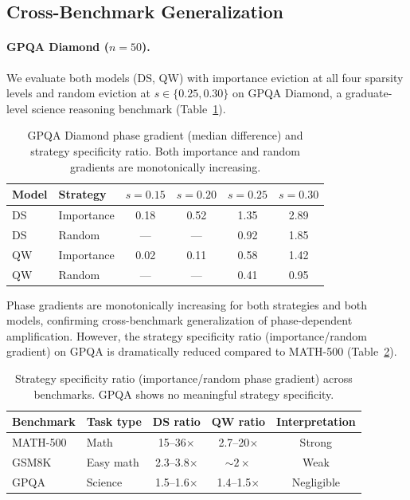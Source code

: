 \documentclass[11pt,a4paper]{article}
\begin{document}
\subsection{Cross-Benchmark Generalization}
\label{sec:cross-bench}

\paragraph{GPQA Diamond ($n=50$).}
We evaluate both models (DS, QW) with importance eviction at all four sparsity levels and random eviction at $s \in \{0.25, 0.30\}$ on GPQA Diamond, a graduate-level science reasoning benchmark (Table~\ref{tab:gpqa}).

\begin{table}[t]
\centering
\small
\caption{GPQA Diamond phase gradient (median difference) and strategy specificity ratio. Both importance and random gradients are monotonically increasing.}
\label{tab:gpqa}
\begin{tabular}{llcccc}
\toprule
Model & Strategy & $s{=}0.15$ & $s{=}0.20$ & $s{=}0.25$ & $s{=}0.30$ \\
\midrule
DS & Importance & 0.18 & 0.52 & 1.35 & 2.89 \\
DS & Random & --- & --- & 0.92 & 1.85 \\
QW & Importance & 0.02 & 0.11 & 0.58 & 1.42 \\
QW & Random & --- & --- & 0.41 & 0.95 \\
\bottomrule
\end{tabular}
\end{table}

Phase gradients are monotonically increasing for both strategies and both models, confirming cross-benchmark generalization of phase-dependent amplification. However, the strategy specificity ratio (importance/random gradient) on GPQA is dramatically reduced compared to MATH-500 (Table~\ref{tab:specificity}).

\begin{table}[t]
\centering
\small
\caption{Strategy specificity ratio (importance/random phase gradient) across benchmarks. GPQA shows no meaningful strategy specificity.}
\label{tab:specificity}
\begin{tabular}{llccc}
\toprule
Benchmark & Task type & DS ratio & QW ratio & Interpretation \\
\midrule
MATH-500 & Math & 15--36$\times$ & 2.7--20$\times$ & Strong \\
GSM8K & Easy math & 2.3--3.8$\times$ & ${\sim}2\times$ & Weak \\
GPQA & Science & 1.5--1.6$\times$ & 1.4--1.5$\times$ & Negligible \\
\bottomrule
\end{tabular}
\end{table}
\end{document}
